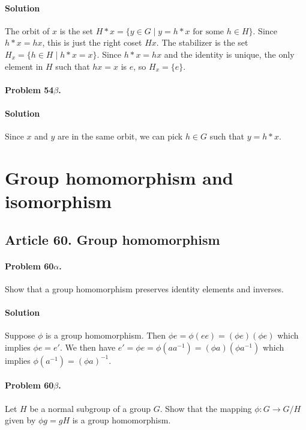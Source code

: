\paragraph*{Solution}
The orbit of $x$ is the set $H * x = \{ y \in G \mid y = h * x \mbox{ for some }
h \in H \} $. Since $ h * x = hx$, this is just the right coset $Hx$. The
stabilizer is the set $ H_x = \{ h \in H \mid h*x = x \}$. Since $h*x=hx$ and
the identity is unique, the only element in $H$ such that $hx =x$ is $e$, so
$H_x = \{ e \}$.

\paragraph{Problem 54$\beta$.}

\paragraph*{Solution}
Since $x$ and $y$ are in the same orbit, we can pick $h \in G$ such that
$ y = h*x $.


\section{Group homomorphism and isomorphism}

\subsection{Article 60. Group homomorphism}

\paragraph{Problem 60$\alpha$.}
Show that a group homomorphism preserves identity elements and inverses.

\paragraph*{Solution}
Suppose $\phi$ is a group homomorphism. Then $\phi e = \phi (ee) = (\phi e) (\phi e)$
which implies $\phi e = e'$. We then have $e' = \phi e = \phi (aa^{-1}) =
(\phi a) (\phi a^{-1})$ which implies $\phi( a^{-1}) = (\phi a)^{-1}$.

\paragraph{Problem 60$\beta$.}
Let $H$ be a normal subgroup of a group $G$. Show that the mapping $\phi : G
\rightarrow G/H$ given by $\phi g = gH$ is a group homomorphism.

